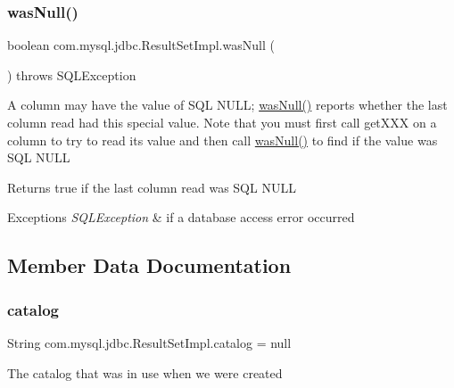 \subsubsection{\texorpdfstring{was\+Null()}{wasNull()}}
{\footnotesize\ttfamily boolean com.\+mysql.\+jdbc.\+Result\+Set\+Impl.\+was\+Null (\begin{DoxyParamCaption}{ }\end{DoxyParamCaption}) throws S\+Q\+L\+Exception}

A column may have the value of S\+QL N\+U\+LL; \mbox{\hyperlink{classcom_1_1mysql_1_1jdbc_1_1_result_set_impl_a05e363f39a9bfbb27736d2b90df9ae99}{was\+Null()}} reports whether the last column read had this special value. Note that you must first call get\+X\+XX on a column to try to read its value and then call \mbox{\hyperlink{classcom_1_1mysql_1_1jdbc_1_1_result_set_impl_a05e363f39a9bfbb27736d2b90df9ae99}{was\+Null()}} to find if the value was S\+QL N\+U\+LL

\begin{DoxyReturn}{Returns}
true if the last column read was S\+QL N\+U\+LL
\end{DoxyReturn}

\begin{DoxyExceptions}{Exceptions}
{\em S\+Q\+L\+Exception} & if a database access error occurred \\
\hline
\end{DoxyExceptions}


\subsection{Member Data Documentation}
\mbox{\label{classcom_1_1mysql_1_1jdbc_1_1_result_set_impl_ae05d8a0ad69c96645b783537100fb95c}} 
\subsubsection{\texorpdfstring{catalog}{catalog}}
{\footnotesize\ttfamily String com.\+mysql.\+jdbc.\+Result\+Set\+Impl.\+catalog = null\hspace{0.3cm}{\ttfamily [protected]}}

The catalog that was in use when we were created \mbox{\label{classcom_1_1mysql_1_1jdbc_1_1_result_set_impl_a1cb5423a275f9f2f1db8505250febb18}} 
